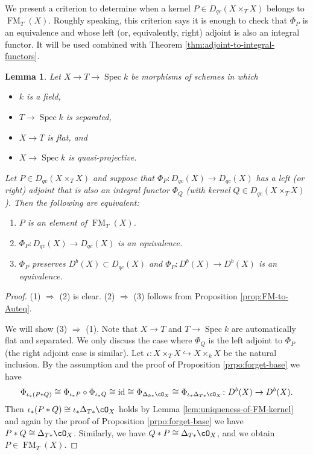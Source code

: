 \documentclass{amsart}
\numberwithin{equation}{section}
\theoremstyle{plain}
\newtheorem{lemma}[theorem]{Lemma}
\theoremstyle{definition}
\DeclareMathOperator{\id}{\mathrm{id}}
\DeclareMathOperator{\Spec}{\mathrm{Spec}}
\DeclareMathOperator{\FM}{\mathrm{FM}}
\begin{document}
We present a criterion to determine when a kernel $P \in D_{qc}(X \times_T X)$ belongs to $\FM_T(X)$.
Roughly speaking, this criterion says it is enough to check that $\Phi_P$ is an equivalence and whose left (or, equivalently, right) adjoint is also an integral functor.
It will be used combined with Theorem \ref{thm:adjoint-to-integral-functors}.
\begin{lemma}\label{lem:criterion-for-invertible-kernel}
    Let $X \to T \to \Spec k$ be morphisms of schemes in which
    \begin{itemize}
        \item $k$ is a field,
        \item $T \to \Spec k$ is separated,
        \item $X \to T$ is flat, and
        \item $X \to \Spec k$ is quasi-projective.
    \end{itemize}
    Let $P \in D_{qc}(X \times_T X)$ and suppose that $\Phi_P \colon D_{qc}(X) \to D_{qc}(X)$ has a left (or right) adjoint that is also an integral functor $\Phi_{Q}$ (with kernel $Q \in D_{qc}(X \times_T X)$).
    Then the following are equivalent:
    \begin{enumerate}
        \item $P$ is an element of $\FM_T(X)$.
        \item $\Phi_P \colon D_{qc}(X) \to D_{qc}(X)$ is an equivalence.
        \item $\Phi_P$ preserves $D^b(X) \subset D_{qc}(X)$ and $\Phi_P \colon D^b(X) \to D^b(X)$ is an equivalence.
    \end{enumerate}
\end{lemma}
\begin{proof}
    (1) $\Rightarrow$ (2) is clear.
    (2) $\Rightarrow$ (3) follows from Proposition \ref{prop:FM-to-Auteq}.

    We will show (3) $\Rightarrow$ (1).
    Note that $X \to T$ and $T \to \Spec k$ are automatically flat and separated.
    We only discuss the case where $\Phi_Q$ is the left adjoint to $\Phi_P$ (the right adjoint case is similar).
    Let $\iota \colon X \times_T X \hookrightarrow X \times_k X$ be the natural inclusion.
    By the assumption and the proof of Proposition \ref{prpo:forget-base} we have
    \begin{equation}
        \Phi_{\iota_*(P*Q)} \cong \Phi_{\iota_*P} \circ \Phi_{\iota_*Q} \cong \id \cong \Phi_{\Delta_{k*}\cO_X} \cong \Phi_{\iota_*\Delta_{T*}\cO_X} \colon D^b(X) \to D^b(X).
    \end{equation}
    Then $\iota_*(P*Q) \cong \iota_*\Delta_{T*}\cO_X$ holds by Lemma \ref{lem:uniqueness-of-FM-kernel} and again by the proof of Proposition \ref{prpo:forget-base} we have $P * Q \cong \Delta_{T*}\cO_X$.
    Similarly, we have $Q * P \cong \Delta_{T*}\cO_X$, and we obtain $P \in \FM_T(X)$.
\end{proof}
\end{document}
